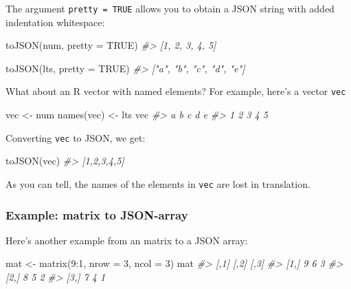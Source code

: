 \documentclass[
]{book}
\newenvironment{Shaded}{\begin{snugshade}}{\end{snugshade}}
\newcommand{\AttributeTok}[1]{\textcolor[rgb]{0.77,0.63,0.00}{#1}}
\newcommand{\CommentTok}[1]{\textcolor[rgb]{0.56,0.35,0.01}{\textit{#1}}}
\newcommand{\ConstantTok}[1]{\textcolor[rgb]{0.00,0.00,0.00}{#1}}
\newcommand{\DecValTok}[1]{\textcolor[rgb]{0.00,0.00,0.81}{#1}}
\newcommand{\FunctionTok}[1]{\textcolor[rgb]{0.00,0.00,0.00}{#1}}
\newcommand{\NormalTok}[1]{#1}
\newcommand{\OtherTok}[1]{\textcolor[rgb]{0.56,0.35,0.01}{#1}}
\newcommand{\SpecialCharTok}[1]{\textcolor[rgb]{0.00,0.00,0.00}{#1}}
\begin{document}
The argument \texttt{pretty\ =\ TRUE} allows you to obtain a JSON string with added
indentation whitespace:

\begin{Shaded}
\begin{Highlighting}[]
\FunctionTok{toJSON}\NormalTok{(num, }\AttributeTok{pretty =} \ConstantTok{TRUE}\NormalTok{)}
\CommentTok{\#\textgreater{} [1, 2, 3, 4, 5]}

\FunctionTok{toJSON}\NormalTok{(lts, }\AttributeTok{pretty =} \ConstantTok{TRUE}\NormalTok{)}
\CommentTok{\#\textgreater{} ["a", "b", "c", "d", "e"]}
\end{Highlighting}
\end{Shaded}

What about an R vector with named elements? For example, here's a vector \texttt{vec}

\begin{Shaded}
\begin{Highlighting}[]
\NormalTok{vec }\OtherTok{\textless{}{-}}\NormalTok{ num}
\FunctionTok{names}\NormalTok{(vec) }\OtherTok{\textless{}{-}}\NormalTok{ lts}
\NormalTok{vec}
\CommentTok{\#\textgreater{} a b c d e }
\CommentTok{\#\textgreater{} 1 2 3 4 5}
\end{Highlighting}
\end{Shaded}

Converting \texttt{vec} to JSON, we get:

\begin{Shaded}
\begin{Highlighting}[]
\FunctionTok{toJSON}\NormalTok{(vec)}
\CommentTok{\#\textgreater{} [1,2,3,4,5]}
\end{Highlighting}
\end{Shaded}

As you can tell, the names of the elements in \texttt{vec} are lost in translation.

\hypertarget{example-matrix-to-json-array}{%
\subsubsection*{Example: matrix to JSON-array}\label{example-matrix-to-json-array}}

Here's another example from an matrix to a JSON array:

\begin{Shaded}
\begin{Highlighting}[]
\NormalTok{mat }\OtherTok{\textless{}{-}} \FunctionTok{matrix}\NormalTok{(}\DecValTok{9}\SpecialCharTok{:}\DecValTok{1}\NormalTok{, }\AttributeTok{nrow =} \DecValTok{3}\NormalTok{, }\AttributeTok{ncol =} \DecValTok{3}\NormalTok{)}
\NormalTok{mat}
\CommentTok{\#\textgreater{}      [,1] [,2] [,3]}
\CommentTok{\#\textgreater{} [1,]    9    6    3}
\CommentTok{\#\textgreater{} [2,]    8    5    2}
\CommentTok{\#\textgreater{} [3,]    7    4    1}
\end{Highlighting}
\end{Shaded}
\end{document}
